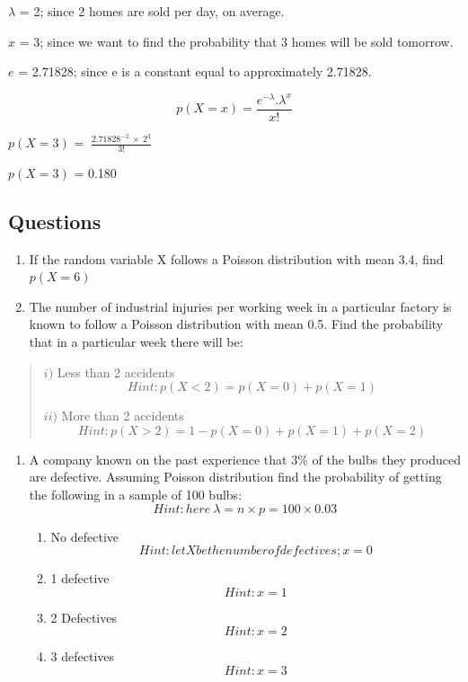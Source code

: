 \documentclass[
]{book}
\begin{document}
\(λ\) = 2; since 2 homes are sold per day, on average.

\(x\) = 3; since we want to find the probability that 3 homes will be sold
tomorrow.

\(e\) = 2.71828; since e is a constant equal to approximately 2.71828.

\[p\left( X = x \right) = \frac{e^{- \lambda}.\lambda^{x}}{x!}\]

\(p(X=3)\) = \(\ \frac{{2.71828}^{- 2}{\  \times \ 2}^{3}}{3!}\)

\(p(X = 3)\) = 0.180

\hypertarget{questions}{%
\subsection*{Questions}\label{questions}}

\begin{enumerate}
\def\labelenumi{\arabic{enumi}.}
\item
  If the random variable X follows a Poisson distribution with mean
  3.4, find \(p(X = 6)\)
\item
  The number of industrial injuries per working week in a particular
  factory is known to follow a Poisson distribution with mean 0.5.
  Find the probability that in a particular week there will be:
\end{enumerate}

\begin{quote}
\(i)\) Less than 2 accidents \[Hint: p(X<2) = p(X = 0) + p(X = 1)\]

\(ii)\) More than 2 accidents \[Hint: p(X>2) = 1-{p(X = 0) + p(X = 1)
+ p(X =2)}\]
\end{quote}

\begin{enumerate}
\def\labelenumi{\arabic{enumi}.}
\setcounter{enumi}{2}
\item
  A company known on the past experience that 3\% of the bulbs they
  produced are defective. Assuming Poisson distribution find the
  probability of getting the following in a sample of 100 bulbs:
  \[Hint: here  \ λ = n × p = 100 × 0.03\]

  \begin{enumerate}
  \def\labelenumii{\alph{enumii}.}
  \item
    No defective \[Hint: let X be the number of defectives; x = 0\]
  \item
    1 defective \[Hint: x = 1\]
  \item
    2 Defectives \[Hint: x = 2\]
  \item
    3 defectives\[Hint: x = 3\]
  \end{enumerate}
\end{enumerate}
\end{document}
